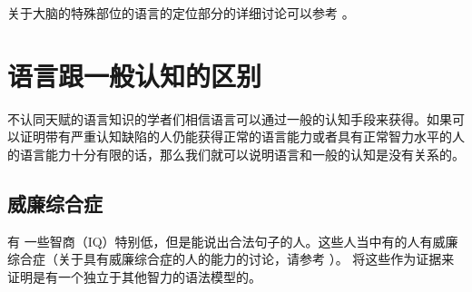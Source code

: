 关于大脑的特殊部位的语言的定位部分的详细讨论可以参考 。

\section{语言跟一般认知的区别}

不认同天赋的语言知识的学者们相信语言可以通过一般的认知手段来获得。如果可以证明带有严重认知缺陷的人仍能获得正常的语言能力或者具有正常智力水平的人的语言能力十分有限的话，那么我们就可以说明语言和一般的认知是没有关系的。

\subsection{威廉综合症}

有 一些智商（IQ）特别低，但是能说出合法句子的人。这些人当中有的人有威廉综合症（关于具有威廉综合症的人的能力的讨论，请参考 ）。 \citet{Yamada81a}将这些作为证据来证明是有一个独立于其他智力的语法模型的。

